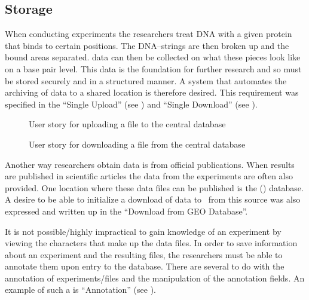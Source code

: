 \subsection{Storage}

When conducting experiments the researchers treat DNA with a given protein that binds to certain positions. The DNA--strings are then broken up and the bound areas separated.  data can then be collected on what these pieces look like on a base pair level. This data is the foundation for further research and so must be stored securely and in a structured manner. A system that automates the archiving of  data to a shared location is therefore desired. This requirement was specified in the  ``Single Upload'' (see ) and ``Single Download'' (see ).

\begin{figure}[h!]
\caption{User story for uploading a file to the central database}
\label{fig:target_upload}
\end{figure}

\begin{figure}[h!]
\caption{User story for downloading a file from the central database}
\label{fig:target_download}
\end{figure}

Another way researchers obtain  data is from official publications. When results are published in scientific articles the  data from the experiments are often also provided. One location where these  data files can be published is the  () database. A desire to be able to initialize a download of  data to \appName\ from this source was also expressed and written up in the  ``Download from GEO Database''. 

It is not possible/highly impractical to gain knowledge of an experiment by viewing the characters that make up the  data files. In order to save information about an experiment and the resulting files, the researchers must be able to annotate them upon entry to the database. There are several  to do with the annotation of experiments/files and the manipulation of the annotation fields. An example of such a  is ``Annotation'' (see ).

